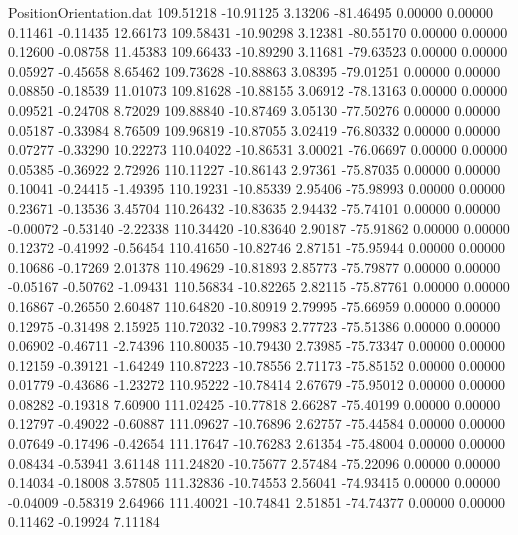 \begin{filecontents}{PositionOrientation.dat}
 109.51218  -10.91125    3.13206   -81.46495    0.00000    0.00000    0.11461   -0.11435   12.66173
 109.58431  -10.90298    3.12381   -80.55170    0.00000    0.00000    0.12600   -0.08758   11.45383
 109.66433  -10.89290    3.11681   -79.63523    0.00000    0.00000    0.05927   -0.45658    8.65462
 109.73628  -10.88863    3.08395   -79.01251    0.00000    0.00000    0.08850   -0.18539   11.01073
 109.81628  -10.88155    3.06912   -78.13163    0.00000    0.00000    0.09521   -0.24708    8.72029
 109.88840  -10.87469    3.05130   -77.50276    0.00000    0.00000    0.05187   -0.33984    8.76509
 109.96819  -10.87055    3.02419   -76.80332    0.00000    0.00000    0.07277   -0.33290   10.22273
 110.04022  -10.86531    3.00021   -76.06697    0.00000    0.00000    0.05385   -0.36922    2.72926
 110.11227  -10.86143    2.97361   -75.87035    0.00000    0.00000    0.10041   -0.24415   -1.49395
 110.19231  -10.85339    2.95406   -75.98993    0.00000    0.00000    0.23671   -0.13536    3.45704
 110.26432  -10.83635    2.94432   -75.74101    0.00000    0.00000   -0.00072   -0.53140   -2.22338
 110.34420  -10.83640    2.90187   -75.91862    0.00000    0.00000    0.12372   -0.41992   -0.56454
 110.41650  -10.82746    2.87151   -75.95944    0.00000    0.00000    0.10686   -0.17269    2.01378
 110.49629  -10.81893    2.85773   -75.79877    0.00000    0.00000   -0.05167   -0.50762   -1.09431
 110.56834  -10.82265    2.82115   -75.87761    0.00000    0.00000    0.16867   -0.26550    2.60487
 110.64820  -10.80919    2.79995   -75.66959    0.00000    0.00000    0.12975   -0.31498    2.15925
 110.72032  -10.79983    2.77723   -75.51386    0.00000    0.00000    0.06902   -0.46711   -2.74396
 110.80035  -10.79430    2.73985   -75.73347    0.00000    0.00000    0.12159   -0.39121   -1.64249
 110.87223  -10.78556    2.71173   -75.85152    0.00000    0.00000    0.01779   -0.43686   -1.23272
 110.95222  -10.78414    2.67679   -75.95012    0.00000    0.00000    0.08282   -0.19318    7.60900
 111.02425  -10.77818    2.66287   -75.40199    0.00000    0.00000    0.12797   -0.49022   -0.60887
 111.09627  -10.76896    2.62757   -75.44584    0.00000    0.00000    0.07649   -0.17496   -0.42654
 111.17647  -10.76283    2.61354   -75.48004    0.00000    0.00000    0.08434   -0.53941    3.61148
 111.24820  -10.75677    2.57484   -75.22096    0.00000    0.00000    0.14034   -0.18008    3.57805
 111.32836  -10.74553    2.56041   -74.93415    0.00000    0.00000   -0.04009   -0.58319    2.64966
 111.40021  -10.74841    2.51851   -74.74377    0.00000    0.00000    0.11462   -0.19924    7.11184

\end{filecontents}
